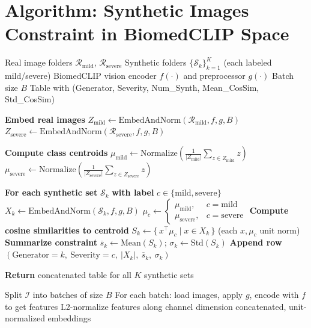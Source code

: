 \documentclass[10pt]{article}
\begin{document}
\section*{Algorithm: Synthetic Images Constraint in BiomedCLIP Space}

\begin{algorithm}[H]
\caption{Algorithm: Compute synthetic image constraint \& consistency  via cosine similarity to real image centroids}
\begin{small}
\begin{algorithmic}[1]
\Require Real image folders $\mathcal{R}_{\text{mild}}$, $\mathcal{R}_{\text{severe}}$
\Require Synthetic folders $\{\mathcal{S}_k\}_{k=1}^K$ (each labeled mild/severe)
\Require BiomedCLIP vision encoder $f(\cdot)$ and preprocessor $g(\cdot)$
\Require Batch size $B$
\Ensure Table with (Generator, Severity, Num\_Synth, Mean\_CosSim, Std\_CosSim)

\State \textbf{Embed real images}
\State $Z_{\text{mild}} \gets \text{EmbedAndNorm}(\mathcal{R}_{\text{mild}}, f, g, B)$
\State $Z_{\text{severe}} \gets \text{EmbedAndNorm}(\mathcal{R}_{\text{severe}}, f, g, B)$

\State \textbf{Compute class centroids}
\State $\mu_{\text{mild}} \gets \text{Normalize}\!\left(\frac{1}{|Z_{\text{mild}}|}\sum_{z \in Z_{\text{mild}}} z\right)$
\State $\mu_{\text{severe}} \gets \text{Normalize}\!\left(\frac{1}{|Z_{\text{severe}}|}\sum_{z \in Z_{\text{severe}}} z\right)$

\State \textbf{For each synthetic set} $\mathcal{S}_k$ \textbf{with label} $c \in \{\text{mild},\text{severe}\}$
\State \quad $X_k \gets \text{EmbedAndNorm}(\mathcal{S}_k, f, g, B)$
\State \quad $\mu_c \gets \begin{cases}
\mu_{\text{mild}}, & c=\text{mild}\\
\mu_{\text{severe}}, & c=\text{severe}
\end{cases}$
\State \quad \textbf{Compute cosine similarities to centroid}
\State \quad $S_k \gets \{\, x^\top \mu_c \;|\; x \in X_k \,\}$ \hfill (each $x,\mu_c$ unit norm)
\State \quad \textbf{Summarize constraint}
\State \quad $\overline{s}_k \gets \text{Mean}(S_k)$; \; $\sigma_k \gets \text{Std}(S_k)$
\State \quad \textbf{Append row} $(\text{Generator}=k,\ \text{Severity}=c,\ |X_k|,\ \overline{s}_k,\ \sigma_k)$

\State \textbf{Return} concatenated table for all $K$ synthetic sets

  \State Split $\mathcal{I}$ into batches of size $B$
  \State For each batch: load images, apply $g$, encode with $f$ to get features
  \State L2-normalize features along channel dimension
  \State \Return concatenated, unit-normalized embeddings
\EndFunction

\end{algorithmic}
\end{small}
\end{algorithm}
\end{document}

